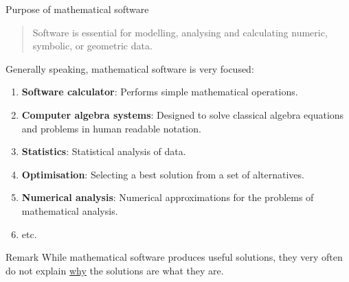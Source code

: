 \documentclass[,aspectratio=169]{beamer}
\begin{document}
\begin{frame}{Purpose of mathematical software}
\begin{quote}
Software is essential for modelling, analysing and calculating numeric,
symbolic, or geometric data.
\end{quote}

Generally speaking, mathematical software is very focused:

\begin{enumerate}
\item
  \textbf{Software calculator}: Performs simple mathematical operations.
\item
  \textbf{Computer algebra systems}: Designed to solve classical algebra
  equations and problems in human readable notation.
\item
  \textbf{Statistics}: Statistical analysis of data.
\item
  \textbf{Optimisation}: Selecting a best solution from a set of
  alternatives.
\item
  \textbf{Numerical analysis}: Numerical approximations for the problems
  of mathematical analysis.
\item
  etc.
\end{enumerate}

\begin{block}{Remark}
\protect\hypertarget{remark}{}
While mathematical software produces useful solutions, they very often
do not explain \underline{why} the solutions are what they are.
\end{block}
\end{frame}
\end{document}
